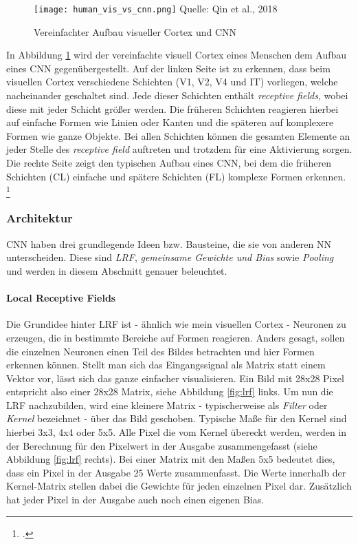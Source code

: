 
\begin{figure}[t]
    \centering
    \caption[]{Vereinfachter Aufbau visueller Cortex und \ac{CNN}}
	\label{fig:humVisVsCNN}
    \texttt{[image: human\_vis\_vs\_cnn.png]}
    Quelle: Qin et al., 2018
\end{figure}

In Abbildung \ref{fig:humVisVsCNN} wird der vereinfachte visuell Cortex eines Menschen dem Aufbau eines \ac{CNN} gegenübergestellt. Auf der linken Seite ist zu erkennen, dass beim visuellen Cortex verschiedene Schichten (V1, V2, V4 und IT) vorliegen, welche nacheinander geschaltet sind. Jede dieser Schichten enthält \textit{receptive fields}, wobei diese mit jeder Schicht größer werden. Die früheren Schichten reagieren hierbei auf einfache Formen wie Linien oder Kanten und die späteren auf komplexere Formen wie ganze Objekte. Bei allen Schichten können die gesamten Elemente an jeder Stelle des \textit{receptive field} auftreten und trotzdem für eine Aktivierung sorgen. Die rechte Seite zeigt den typischen Aufbau eines \ac{CNN}, bei dem die früheren Schichten (CL) einfache und spätere Schichten (FL) komplexe Formen erkennen. \footcite[Vgl. ][S. 6]{qinHowConvolutionalNeural2018}

\subsubsection{Architektur}
\ac{CNN} haben drei grundlegende Ideen bzw. Bausteine, die sie von anderen \ac{NN} unterscheiden. Diese sind \textit{\ac{LRF}}, \textit{gemeinsame Gewichte und Bias} sowie \textit{Pooling} und werden in diesem Abschnitt genauer beleuchtet.

\paragraph{Local Receptive Fields} \label{LocalReceptiveFields}
Die Grundidee hinter \ac{LRF} ist - ähnlich wie mein visuellen Cortex - Neuronen zu erzeugen, die in bestimmte Bereiche auf Formen reagieren. Anders gesagt, sollen die einzelnen Neuronen einen Teil des Bildes betrachten und hier Formen erkennen können. Stellt man sich das Eingangssignal als Matrix statt einem Vektor vor, lässt sich das ganze einfacher visualisieren. Ein Bild mit 28x28 Pixel entspricht also einer 28x28 Matrix, siehe Abbildung \ref{fig:lrf} links. Um nun die \ac{LRF} nachzubilden, wird eine kleinere Matrix - typischerweise als \textit{Filter} oder \textit{Kernel} bezeichnet - über das Bild geschoben. Typische Maße für den Kernel sind hierbei 3x3, 4x4 oder 5x5. Alle Pixel die vom Kernel übereckt werden, werden in der Berechnung für den Pixelwert in der Ausgabe zusammengefasst (siehe Abbildung \ref{fig:lrf} rechts). Bei einer Matrix mit den Maßen 5x5 bedeutet dies, dass ein Pixel in der Ausgabe 25 Werte zusammenfasst. Die Werte innerhalb der Kernel-Matrix stellen dabei die Gewichte für jeden einzelnen Pixel dar. Zusätzlich hat jeder Pixel in der Ausgabe auch noch einen eigenen Bias.

